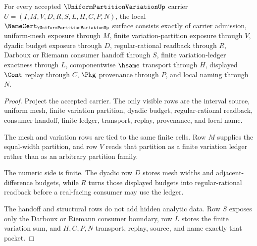 \begin{theorem}
\label{thm:uniform-partition-variation-namecert-obligations}
For every accepted $\UniformPartitionVariationUp$ carrier $U=(I,M,V,D,R,S,L,H,C,P,N)$, the local $\NameCert_{\UniformPartitionVariationUp}$ surface consists exactly of carrier admission, uniform-mesh exposure through $M$, finite variation-partition exposure through $V$, dyadic budget exposure through $D$, regular-rational readback through $R$, Darboux or Riemann consumer handoff through $S$, finite variation-ledger exactness through $L$, componentwise $\hsame$ transport through $H$, displayed $\Cont$ replay through $C$, $\Pkg$ provenance through $P$, and local naming through $N$.
\end{theorem}
\begin{proof}
Project the accepted carrier. The only visible rows are the interval source, uniform mesh, finite variation partition, dyadic budget, regular-rational readback, consumer handoff, finite ledger, transport, replay, provenance, and local name.

The mesh and variation rows are tied to the same finite cells. Row $M$ supplies the equal-width partition, and row $V$ reads that partition as a finite variation ledger rather than as an arbitrary partition family.

The numeric side is finite. The dyadic row $D$ stores mesh widths and adjacent-difference budgets, while $R$ turns those displayed budgets into regular-rational readback before a real-facing consumer may use the ledger.

The handoff and structural rows do not add hidden analytic data. Row $S$ exposes only the Darboux or Riemann consumer boundary, row $L$ stores the finite variation sum, and $H,C,P,N$ transport, replay, source, and name exactly that packet.
\end{proof}

